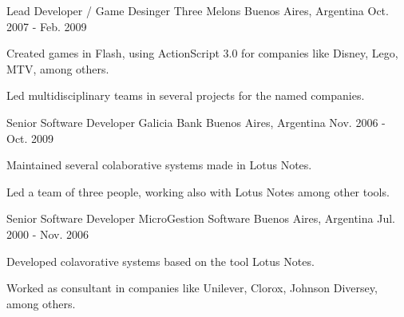 \begin{cventries}
    \cventry
    {Lead Developer / Game Desinger} %
    {Three Melons} %
    {Buenos Aires, Argentina} %
    {Oct. 2007 - Feb. 2009} %
    {
    \begin{cvitems} %
        \item {Created games in Flash, using ActionScript 3.0 for companies like Disney, Lego, MTV, among others.}
        \item {Led multidisciplinary teams in several projects for the named companies.}
    \end{cvitems}
    }

    \cventry
    {Senior Software Developer} %
    {Galicia Bank} %
    {Buenos Aires, Argentina} %
    {Nov. 2006 - Oct. 2009} %
    {
    \begin{cvitems} %
        \item {Maintained several colaborative systems made in Lotus Notes.}
        \item {Led a team of three people, working also with Lotus Notes among other tools.}
    \end{cvitems}
    }

    \cventry
    {Senior Software Developer} %
    {MicroGestion Software} %
    {Buenos Aires, Argentina} %
    {Jul. 2000 - Nov. 2006} %
    {
    \begin{cvitems} %
        \item {Developed colavorative systems based on the tool Lotus Notes.}
        \item {Worked as consultant in companies like Unilever, Clorox, Johnson Diversey, among others.}
    \end{cvitems}
    }

\end{cventries}
